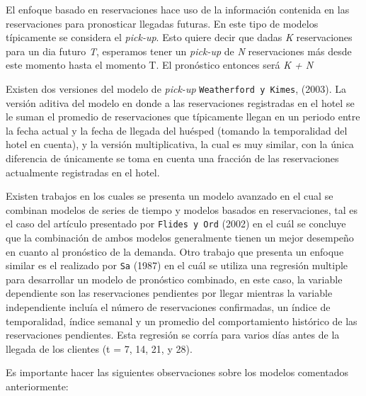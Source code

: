 {El enfoque basado en reservaciones hace uso de la información contenida en las reservaciones para pronosticar llegadas futuras. En este tipo de modelos típicamente se considera el \emph{pick-up}. Esto quiere decir que dadas \emph{K} reservaciones para un dia futuro \emph{T}, esperamos tener un \emph{pick-up} de \emph{N} reservaciones más desde este momento hasta el momento T. El pronóstico entonces será \emph{K + N}

Existen dos versiones del modelo de \emph{pick-up} \texttt{Weatherford y Kimes}, (2003). La versión aditiva del modelo en donde a las reservaciones registradas en el hotel se le suman el promedio de reservaciones que típicamente llegan en un periodo entre la fecha actual y la fecha de llegada del huésped (tomando la temporalidad del hotel en cuenta), y la versión multiplicativa, la cual es muy similar, con la única diferencia de únicamente se toma en cuenta una fracción de las reservaciones actualmente registradas en el hotel.

Existen trabajos en los cuales se presenta un modelo avanzado en el cual se combinan modelos de series de tiempo y modelos basados en reservaciones, tal es el caso del artículo presentado por \texttt{Flides y Ord} (2002) en el cuál se concluye que la combinación de ambos modelos generalmente tienen un mejor desempeño en cuanto al pronóstico de la demanda. Otro trabajo que presenta un enfoque similar es el realizado por \texttt{Sa} (1987) en el cuál se utiliza una regresión multiple para desarrollar un modelo de pronóstico combinado, en este caso, la variable dependiente son las reservaciones pendientes por llegar mientras la variable independiente incluía el número de reservaciones confirmadas, un índice de temporalidad,  índice semanal y un promedio del comportamiento histórico de las reservaciones pendientes. Esta regresión se corría para varios días antes de la llegada de los clientes (t = 7, 14, 21, y 28).

Es importante hacer las siguientes observaciones sobre los modelos comentados anteriormente:

}
